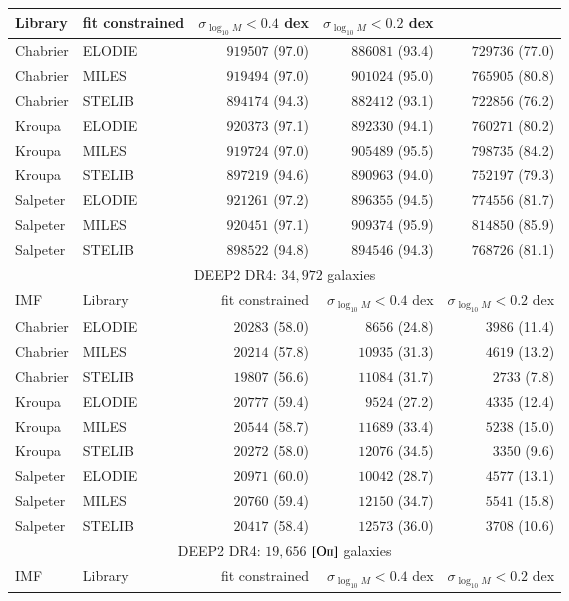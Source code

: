 \documentclass[onecolumn]{aa}
\newcommand{\OII}{$\left[\mathrm{O\textrm{\textsc{ii}}}\right]$\xspace}
\begin{document}
\begin{table*}
\begin{center}
\begin{tabular}{ll rrr}
Library & 
fit constrained & 
$\sigma_{\log_{10}M}<0.4$ dex & 
$\sigma_{\log_{10}M}<0.2$ dex \\ \hline
Chabrier & ELODIE & $919507$ (97.0) & $886081$ (93.4) & $729736$ (77.0) \\ 
Chabrier & MILES & $919494$ (97.0) & $901024$ (95.0) & $765905$ (80.8) \\ 
Chabrier & STELIB & $894174$ (94.3) & $882412$ (93.1) & $722856$ (76.2) \\ 
Kroupa & ELODIE & $920373$ (97.1) & $892330$ (94.1) & $760271$ (80.2) \\ 
Kroupa & MILES & $919724$ (97.0) & $905489$ (95.5) & $798735$ (84.2) \\ 
Kroupa & STELIB & $897219$ (94.6) & $890963$ (94.0) & $752197$ (79.3) \\ 
Salpeter & ELODIE & $921261$ (97.2) & $896355$ (94.5) & $774556$ (81.7) \\ 
Salpeter & MILES & $920451$ (97.1) & $909374$ (95.9) & $814850$ (85.9) \\ 
Salpeter & STELIB & $898522$ (94.8) & $894546$ (94.3) & $768726$ (81.1) \\ 
\hline 
\multicolumn{5}{c}{DEEP2 DR4: $34,972$ galaxies} \\
IMF &
Library & 
fit constrained & 
$\sigma_{\log_{10}M}<0.4$ dex & 
$\sigma_{\log_{10}M}<0.2$ dex \\ \hline
Chabrier & ELODIE& $20283$ (58.0) & $8656$ (24.8) & $3986$ (11.4) \\ 
Chabrier & MILES& $20214$ (57.8) & $10935$ (31.3) & $4619$ (13.2) \\ 
Chabrier & STELIB& $19807$ (56.6) & $11084$ (31.7) & $2733$ (7.8) \\ 
Kroupa & ELODIE& $20777$ (59.4) & $9524$ (27.2) & $4335$ (12.4) \\ 
Kroupa & MILES& $20544$ (58.7) & $11689$ (33.4) & $5238$ (15.0) \\ 
Kroupa & STELIB& $20272$ (58.0) & $12076$ (34.5) & $3350$ (9.6) \\ 
Salpeter & ELODIE& $20971$ (60.0) & $10042$ (28.7) & $4577$ (13.1) \\ 
Salpeter & MILES& $20760$ (59.4) & $12150$ (34.7) & $5541$ (15.8) \\ 
Salpeter & STELIB& $20417$ (58.4) & $12573$ (36.0) & $3708$ (10.6) \\ 
\hline 
\multicolumn{5}{c}{DEEP2 DR4: $19,656$ \OII galaxies} \\
IMF &
Library & 
fit constrained & 
$\sigma_{\log_{10}M}<0.4$ dex & 
$\sigma_{\log_{10}M}<0.2$ dex \\ \hline

\end{tabular}
\end{center}
\end{table*}
\end{document}
